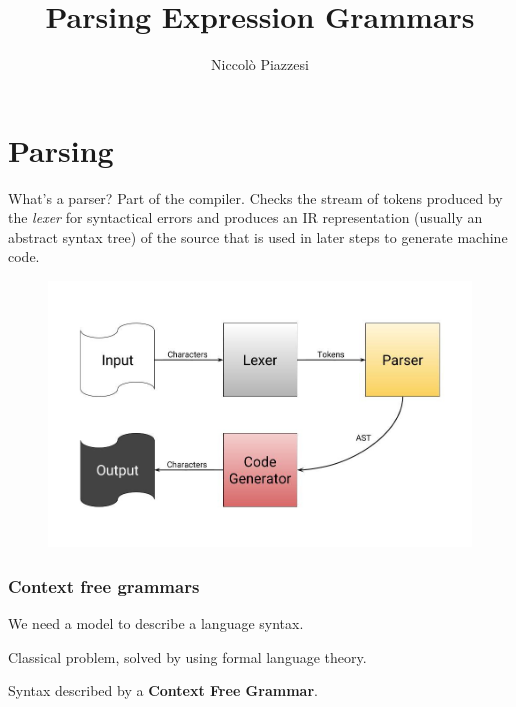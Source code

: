 \documentclass{beamer}
\title{Parsing Expression Grammars}
\author{Niccolò Piazzesi}
\institute[UniPi]{
    Università degli Studi di Pisa \\
    Anno Accademico 2020-21
}
\begin{document}
    \begin{frame}
        \maketitle
    \end{frame}
    \section{Parsing}
    \begin{frame}
        \begin{block}{What's a parser?}
            Part of the compiler.
            Checks the stream of tokens produced by the \emph{lexer} for syntactical errors
            and produces an IR representation (usually an abstract syntax tree) of the source 
            that is used in later steps to generate machine code.
        \end{block}
        \begin{figure}
            \includegraphics[width=\textwidth]{img/parser.jpg}
        \end{figure}
    \end{frame}
    \begin{frame}
        \frametitle{Context free grammars}
        
        \begin{block}{}We need a model to describe a language syntax.\end{block}
        \pause
        \begin{block}{}Classical problem, solved by using formal language theory.\end{block}
        \pause
        \begin{block}{}{Syntax described by a \textbf{Context Free Grammar}.}\end{block}

    \end{frame}
\end{document}
